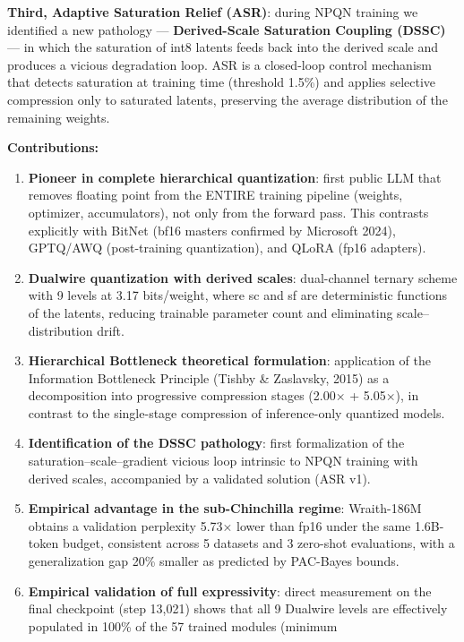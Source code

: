 \textbf{Third, Adaptive Saturation Relief (ASR)}: during NPQN training
we identified a new pathology --- \textbf{Derived-Scale Saturation
Coupling (DSSC)} --- in which the saturation of int8 latents feeds back
into the derived scale and produces a vicious degradation loop. ASR is a
closed-loop control mechanism that detects saturation at training time
(threshold 1.5\%) and applies selective compression only to saturated
latents, preserving the average distribution of the remaining weights.

\textbf{Contributions:}

\begin{enumerate}
\def\labelenumi{\arabic{enumi}.}
\item
  \textbf{Pioneer in complete hierarchical quantization}: first public
  LLM that removes floating point from the ENTIRE training pipeline
  (weights, optimizer, accumulators), not only from the forward pass.
  This contrasts explicitly with BitNet (bf16 masters confirmed by
  Microsoft 2024), GPTQ/AWQ (post-training quantization), and QLoRA
  (fp16 adapters).
\item
  \textbf{Dualwire quantization with derived scales}: dual-channel
  ternary scheme with 9 levels at 3.17 bits/weight, where sc and sf are
  deterministic functions of the latents, reducing trainable parameter
  count and eliminating scale--distribution drift.
\item
  \textbf{Hierarchical Bottleneck theoretical formulation}: application
  of the Information Bottleneck Principle (Tishby \& Zaslavsky, 2015) as
  a decomposition into progressive compression stages (2.00× + 5.05×),
  in contrast to the single-stage compression of inference-only
  quantized models.
\item
  \textbf{Identification of the DSSC pathology}: first formalization of
  the saturation--scale--gradient vicious loop intrinsic to NPQN
  training with derived scales, accompanied by a validated solution (ASR
  v1).
\item
  \textbf{Empirical advantage in the sub-Chinchilla regime}: Wraith-186M
  obtains a validation perplexity 5.73× lower than fp16 under the same
  1.6B-token budget, consistent across 5 datasets and 3 zero-shot
  evaluations, with a generalization gap 20\% smaller as predicted by
  PAC-Bayes bounds.
\item
  \textbf{Empirical validation of full expressivity}: direct measurement
  on the final checkpoint (step 13,021) shows that all 9 Dualwire levels
  are effectively populated in 100\% of the 57 trained modules (minimum

\end{enumerate}
